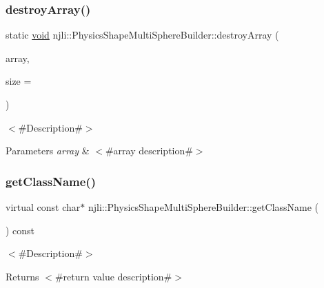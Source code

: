 \subsubsection{\texorpdfstring{destroy\+Array()}{destroyArray()}}
{\footnotesize\ttfamily static \mbox{\hyperlink{_thread_8h_af1e856da2e658414cb2456cb6f7ebc66}{void}} njli\+::\+Physics\+Shape\+Multi\+Sphere\+Builder\+::destroy\+Array (\begin{DoxyParamCaption}\item[{\mbox{\hyperlink{classnjli_1_1_physics_shape_multi_sphere_builder}{Physics\+Shape\+Multi\+Sphere\+Builder}} $\ast$$\ast$}]{array,  }\item[{const \mbox{\hyperlink{_util_8h_a10e94b422ef0c20dcdec20d31a1f5049}{u32}}}]{size = {} }\end{DoxyParamCaption})\hspace{0.3cm}{\ttfamily [static]}}

$<$\#\+Description\#$>$


\begin{DoxyParams}{Parameters}
{\em array} & $<$\#array description\#$>$ \\
\hline
\end{DoxyParams}
\mbox{\label{classnjli_1_1_physics_shape_multi_sphere_builder_a66426aca342f51ea918d64690a74d4c5}} 
\subsubsection{\texorpdfstring{get\+Class\+Name()}{getClassName()}}
{\footnotesize\ttfamily virtual const char$\ast$ njli\+::\+Physics\+Shape\+Multi\+Sphere\+Builder\+::get\+Class\+Name (\begin{DoxyParamCaption}{ }\end{DoxyParamCaption}) const\hspace{0.3cm}{\ttfamily [virtual]}}

$<$\#\+Description\#$>$

\begin{DoxyReturn}{Returns}
$<$\#return value description\#$>$ 
\end{DoxyReturn}


